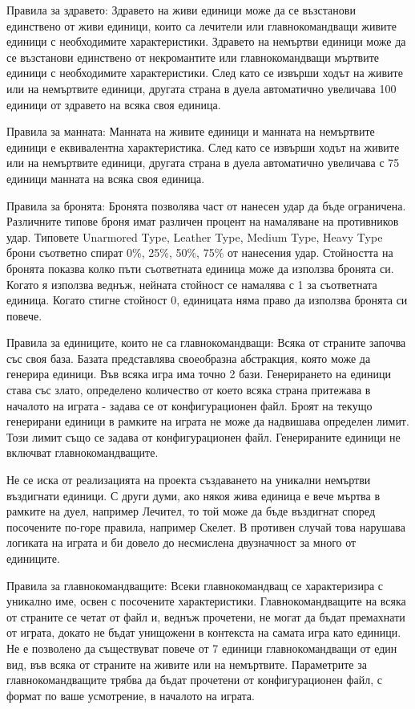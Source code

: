 Правила за здравето\+: Здравето на живи единици може да се възстанови единствено от живи единици, които са лечители или главнокомандващи живите единици с необходимите характеристики. Здравето на немъртви единици може да се възстанови единствено от некромантите или главнокомандващи мъртвите единици с необходимите характеристики. След като се извърши ходът на живите или на немъртвите единици, другата страна в дуела автоматично увеличава 100 единици от здравето на всяка своя единица.

Правила за манната\+: Манната на живите единици и манната на немъртвите единици е еквивалентна характеристика. След като се извърши ходът на живите или на немъртвите единици, другата страна в дуела автоматично увеличава с 75 единици манната на всяка своя единица.

Правила за бронята\+: Бронята позволява част от нанесен удар да бъде ограничена. Различните типове броня имат различен процент на намаляване на противников удар. Типовете Unarmored Type, Leather Type, Medium Type, Heavy Type брони съответно спират 0\%, 25\%, 50\%, 75\% от нанесения удар. Стойността на бронята показва колко пъти съответната единица може да използва бронята си. Когато я използва веднъж, нейната стойност се намалява с 1 за съответната единица. Когато стигне стойност 0, единицата няма право да използва бронята си повече.

Правила за единиците, които не са главнокомандващи\+: Всяка от страните започва със своя база. Базата представлява своеобразна абстракция, която може да генерира единици. Във всяка игра има точно 2 бази. Генерирането на единици става със злато, определено количество от което всяка страна притежава в началото на играта -\/ задава се от конфигурационен файл. Броят на текущо генерирани единици в рамките на играта не може да надвишава определен лимит. Този лимит също се задава от конфигурационен файл. Генерираните единици не включват главнокомандващите.

Не се иска от реализацията на проекта създаването на уникални немъртви въздигнати единици. С други думи, ако някоя жива единица е вече мъртва в рамките на дуел, например Лечител, то той може да бъде въздигнат според посочените по-\/горе правила, например Скелет. В противен случай това нарушава логиката на играта и би довело до несмислена двузначност за много от единиците.

Правила за главнокомандващите\+: Всеки главнокомандващ се характеризира с уникално име, освен с посочените характеристики. Главнокомандващите на всяка от страните се четат от файл и, веднъж прочетени, не могат да бъдат премахнати от играта, докато не бъдат унищожени в контекста на самата игра като единици. Не е позволено да съществуват повече от 7 единици главнокомандващи от един вид, във всяка от страните на живите или на немъртвите. Параметрите за главнокомандващите трябва да бъдат прочетени от конфигурационен файл, с формат по ваше усмотрение, в началото на играта.

